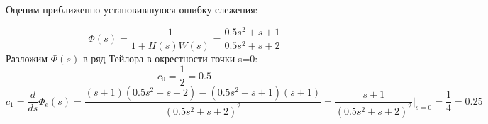 \documentclass[a4paper, 11pt]{article}
\begin{document}
Оценим приближенно установившуюся ошибку слежения:

\begin{equation}
\varPhi(s) = \frac{1}{{1 + H(s)W(s)}} = \frac{{0.5{s^2} + s + 1}}{{0.5{s^2} + s + 2}}
\end{equation}
Разложим $\varPhi(s)$ в ряд Тейлора в окрестности точки s=0:
\[{c_0} = \frac{1}{2} = 0.5\]
\[{c_1} = \frac{d}{{ds}}{\Phi _e}(s) = \frac{{(s + 1)(0.5{s^2} + s + 2) - (0.5{s^2} + s + 1)(s + 1)}}{{{{(0.5{s^2} + s + 2)}^2}}} = \frac{{s + 1}}{{{{(0.5{s^2} + s + 2)}^2}}}{|_{s = 0}} = \frac{1}{4} = 0.25\]
\end{document}
